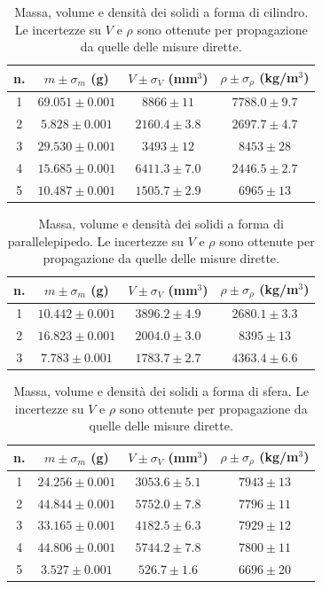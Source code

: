 \documentclass[a4paper]{article}
\begin{document}
\begin{table}[htbp]
    \centering
    \begin{tabular}{c|c|c|c}
      n. & $m\pm \sigma_m$ (g) & $V\pm\sigma_V$ (mm$^3$) & $\rho\pm\sigma_\rho$ (kg/m$^3$)\\
      \hline
      1 & $69.051 \pm 0.001$ & $8866 \pm 11$ & $7788.0 \pm 9.7$ \\
      2 & $5.828 \pm 0.001$ & $2160.4 \pm 3.8$ & $2697.7 \pm 4.7$ \\
      3 & $29.530 \pm 0.001$ & $3493 \pm 12$ & $8453 \pm 28$ \\
      4 & $15.685 \pm 0.001$ & $6411.3 \pm 7.0$ & $2446.5 \pm 2.7$ \\
      5 & $10.487 \pm 0.001$ & $1505.7 \pm 2.9$ & $6965 \pm 13$ \\
    \end{tabular}
    \caption{Massa, volume e densit\`a dei solidi a forma di cilindro. Le incertezze su $V$ e $\rho$ sono ottenute per propagazione da quelle delle misure dirette.}
    \label{tab:mVr_cilindri}
\end{table}
\begin{table}[htbp]
    \centering
    \begin{tabular}{c|c|c|c}
      n. & $m\pm \sigma_m$ (g) & $V\pm\sigma_V$ (mm$^3$) & $\rho\pm\sigma_\rho$ (kg/m$^3$)\\
      \hline
      1 & $10.442 \pm 0.001$ & $3896.2 \pm 4.9$ & $2680.1 \pm 3.3$ \\
      2 & $16.823 \pm 0.001$ & $2004.0 \pm 3.0$ & $8395 \pm 13$ \\
      3 & $7.783 \pm 0.001$ & $1783.7 \pm 2.7$ & $4363.4 \pm 6.6$ \\
    \end{tabular}
    \caption{Massa, volume e densit\`a dei solidi a forma di parallelepipedo. Le incertezze su $V$ e $\rho$ sono ottenute per propagazione da quelle delle misure dirette.}
    \label{tab:mVr_parallelepipedi}
\end{table}
\begin{table}[htbp]
    \centering
    \begin{tabular}{c|c|c|c}
      n. & $m\pm \sigma_m$ (g) & $V\pm\sigma_V$ (mm$^3$) & $\rho\pm\sigma_\rho$ (kg/m$^3$)\\
      \hline
      1 & $24.256 \pm 0.001$ & $3053.6 \pm 5.1$ & $7943 \pm 13$ \\
      2 & $44.844 \pm 0.001$ & $5752.0 \pm 7.8$ & $7796 \pm 11$ \\
      3 & $33.165 \pm 0.001$ & $4182.5 \pm 6.3$ & $7929 \pm 12$ \\
      4 & $44.806 \pm 0.001$ & $5744.2 \pm 7.8$ & $7800 \pm 11$ \\
      5 & $3.527 \pm 0.001$ & $526.7 \pm 1.6$ & $6696 \pm 20$ \\
    \end{tabular}
    \caption{Massa, volume e densit\`a dei solidi a forma di sfera. Le incertezze su $V$ e $\rho$ sono ottenute per propagazione da quelle delle misure dirette.}
    \label{tab:mVr_sfere}
\end{table}
\end{document}
